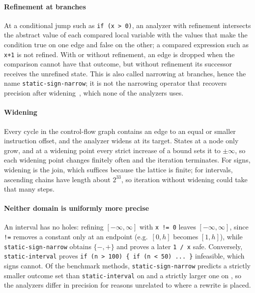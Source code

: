 \paragraph{Refinement at branches}
At a conditional jump such as \texttt{if (x > 0)}, an analyzer with refinement
intersects the abstract value of each compared local variable with the values
that make the condition true on one edge and false on the other; a compared
expression such as \texttt{x+1} is not refined. With or without refinement, an
edge is dropped when the comparison cannot have that outcome, but without
refinement its successor receives the unrefined state. This is also called
narrowing at branches, hence the name \texttt{static-sign-narrow}; it is not
the narrowing operator that recovers precision after
widening~\citep{moller2018spa}, which none of the analyzers uses.

\paragraph{Widening}
Every cycle in the control-flow graph contains an edge to an equal or smaller
instruction offset, and the analyzer widens at its target. States at a node
only grow, and at a widening point every strict increase of a bound sets it to
$\pm\infty$, so each widening point changes finitely often and the iteration
terminates. For signs, widening is the join, which suffices because the
lattice is finite; for intervals, ascending chains have length about $2^{33}$,
so iteration without widening could take that many steps.

\paragraph{Neither domain is uniformly more precise}
An interval has no holes: refining $[-\infty,\infty]$ with \texttt{x != 0}
leaves $[-\infty,\infty]$, since \texttt{!=} removes a constant only at an
endpoint (e.g.\ $[0,h]$ becomes $[1,h]$), while \texttt{static-sign-narrow}
obtains $\{-,+\}$ and proves a later \texttt{1 / x} safe. Conversely,
\texttt{static-interval} proves \texttt{if (n > 100) \{ if (n < 50) ... \}}
infeasible, which signs cannot. Of the \NumMethods{} benchmark methods,
\texttt{static-sign-narrow} predicts a strictly smaller outcome set than
\texttt{static-interval} on \NumNarrowBeatsInterval{} and a strictly larger one
on \NumIntervalBeatsNarrow{}, so the analyzers differ in precision for reasons
unrelated to where a rewrite is placed.
